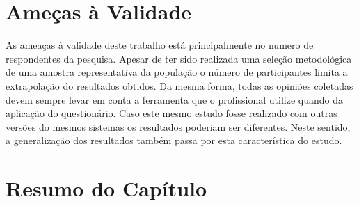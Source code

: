 \section{Ameças à Validade}
As ameaças à validade deste trabalho está principalmente no numero de
respondentes da pesquisa. Apesar de ter sido realizada uma seleção metodológica
de uma amostra representativa da população o número de participantes limita a
extrapolação do resultados obtidos. Da mesma forma, todas as opiniões coletadas
devem sempre levar em conta a ferramenta que o profissional utilize quando da
aplicação do questionário. Caso este mesmo estudo fosse realizado com outras
versões do mesmos sistemas os resultados poderiam ser diferentes. Neste sentido,
a generalização dos resultados também passa por esta característica do estudo.

\section{Resumo do Capítulo}
\label{sec:resumo_do_capitulo}

